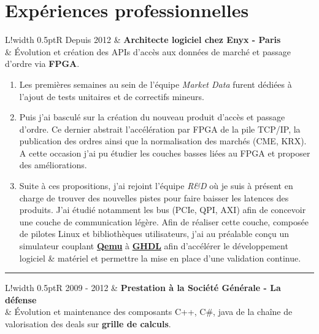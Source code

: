 \documentclass[10pt]{article}
\newcommand{\VRule}{{\color{lightgray}\vrule width 0.5pt}}
\newcommand{\HRule}{\begin{center}{\color{lightgray}\rule{0.5\textwidth}{0.5pt}}\end{center}}
\begin{document}
\clearpage

\section*{Expériences professionnelles}
\begin{longtable}{L!{\VRule}R}
Depuis 2012 & \textbf{Architecte logiciel chez Enyx - Paris}
\\
& Évolution et création des APIs d'accès aux données de marché
  et passage d'ordre via \textbf{FPGA}.
\end{longtable}

\begin{enumerate}
\item Les premières semaines au sein de l'équipe \textit{Market Data}
  furent dédiées à l'ajout de tests
  unitaires et de correctifs mineurs.

\item Puis j'ai basculé sur la création du nouveau
  produit d'accès et passage d'ordre. Ce dernier abstrait
  l'accélération par FPGA de la pile TCP/IP, la publication
  des ordres ainsi que la normalisation des marchés (CME, KRX).
  A cette occasion j'ai pu étudier les couches basses
  liées au FPGA et proposer des améliorations.

\item Suite à ces propositions, j'ai rejoint l'équipe \textit{R\&D}
  où je suis à présent en charge de trouver des nouvelles pistes pour
  faire baisser les latences des produits.
  J'ai étudié notamment les bus (PCIe, QPI, AXI)
  afin de concevoir une couche de communication légère.
  Afin de réaliser cette couche, composée de pilotes Linux et
  bibliothèques utilisateurs, j'ai au préalable conçu un simulateur
  couplant \href{http://qemu.org}{\bf Qemu} à
  \href{http://ghdl.free.fr/}{\bf GHDL} afin d'accélérer le développement
  logiciel \& matériel et permettre la mise en place d'une validation continue.
\end{enumerate}

\HRule

\begin{longtable}{L!{\VRule}R}
2009 - 2012 & \textbf{Prestation à la Société Générale - La défense}
\\
& Évolution et maintenance des composants C++, C\#, java
  de la chaîne de valorisation des deals sur \textbf{grille de calculs}.
\end{longtable}
\end{document}
